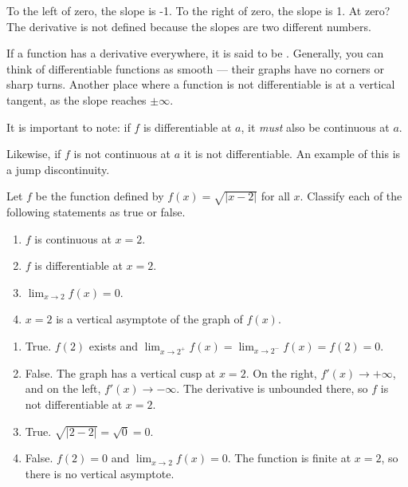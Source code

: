 To the left of zero, the slope is -1. To the right of zero, the slope
is 1.  At zero?  The derivative is not defined because the slopes are two different numbers. 

If a function has a derivative everywhere, it is said to be
. Generally, you can think of differentiable
functions as smooth --- their graphs have no corners or sharp turns. Another place where a function
is not differentiable is at a vertical tangent, as the slope reaches $\pm \infty$. 

It is important to note: if $f$ is differentiable at $a$, it \emph{must} also be continuous at $a$. 

Likewise, if $f$ is not continuous at $a$ it is not differentiable. An example of this is a jump discontinuity. 

\begin{Exercise} Let $f$ 
	be the function defined by $f(x) = \sqrt{|x - 2|}$ for all $x$. 
	Classify each of the following statements as true or false. 
	\begin{enumerate}
		\item $f$ is continuous at $x = 2$. 
		\item $f$ is differentiable at $x = 2$.
		\item $\lim_{x \to 2} f(x) = 0$.
		\item $x = 2$ is a vertical asymptote of the graph of $f(x)$. 
	\end{enumerate}
\end{Exercise}

\begin{Answer}[ref=diff1]
\begin{enumerate}
\item True. $f(2)$ exists and $\lim_{x \to 2^+}f(x) = \lim_{x \to 2^-}f(x) = f(2) = 0$.
\item False. The graph has a vertical cusp at $x=2$. On the right, $f'(x) \to +\infty$, and on the left, $f'(x) \to -\infty$. The derivative is unbounded there, so $f$ is not differentiable at $x = 2$.
\item True. $\sqrt{|2-2|} = \sqrt{0} = 0$.
\item False. $f(2) = 0$ and $\lim_{x \to 2} f(x) = 0$. The function is finite at $x = 2$, so there is no vertical asymptote.
\end{enumerate}
\end{Answer}

